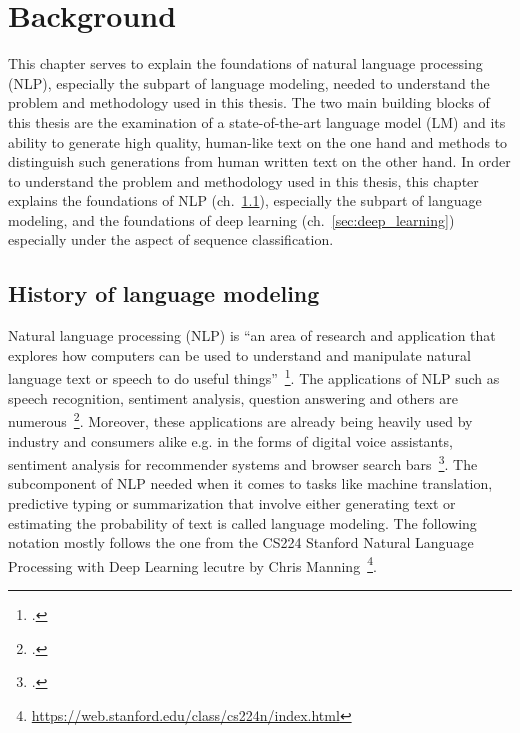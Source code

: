 \section{Background}
\label{ch:background}

This chapter serves to explain the foundations of natural language processing (NLP), especially the subpart of
language modeling, needed to understand the problem and methodology used in this thesis. The two main building blocks
of this thesis are the examination of a state-of-the-art language model (LM) and its ability to generate high quality,
human-like text on the one hand and methods to distinguish such generations from human written text on the other hand.
In order to understand the problem and methodology used in this thesis, this chapter explains the foundations
of NLP (ch.~\ref{sec:history_of_language_modeling}), especially the subpart of language
modeling, and the foundations of deep learning (ch.~\ref{sec:deep_learning}) especially under the aspect of sequence
classification.

\subsection{History of language modeling}
\label{sec:history_of_language_modeling}

Natural language processing (NLP) is “an area of research and application that explores how computers can be used to
understand and manipulate natural language text or speech to do useful things”~\footcite{doi:10.1002/aris.1440370103}.
The applications of NLP such as speech recognition, sentiment analysis,
question answering and others are numerous~\footcite{DBLP:journals/corr/GattK17}.
Moreover, these applications are already being heavily used by industry and
consumers alike e.g. in the forms of digital voice assistants, sentiment analysis for recommender systems
and browser search bars~\footcite{8012330,10.1145/3064663.3064672,GoogleSearch}. The subcomponent of NLP
needed when it comes to tasks like machine translation, predictive typing or summarization that involve either
generating text or estimating the probability of text is called language modeling. The following notation mostly
follows the one from the CS224 Stanford Natural Language Processing with Deep Learning lecutre by Chris Manning~\footnote{\url{https://web.stanford.edu/class/cs224n/index.html}}.

